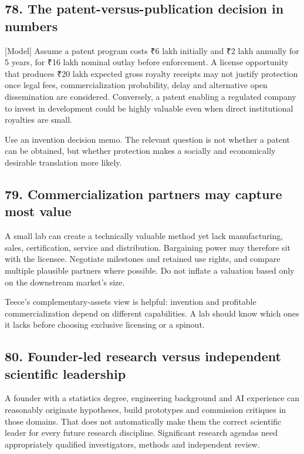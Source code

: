 \subsection{78. The patent-versus-publication decision in numbers}

[Model] Assume a patent program costs ₹6 lakh initially and ₹2 lakh annually for 5 years, for ₹16 lakh nominal outlay before enforcement. A license opportunity that produces ₹20 lakh expected gross royalty receipts may not justify protection once legal fees, commercialization probability, delay and alternative open dissemination are considered. Conversely, a patent enabling a regulated company to invest in development could be highly valuable even when direct institutional royalties are small.

Use an invention decision memo. The relevant question is not whether a patent can be obtained, but whether protection makes a socially and economically desirable translation more likely.

\subsection{79. Commercialization partners may capture most value}

A small lab can create a technically valuable method yet lack manufacturing, sales, certification, service and distribution. Bargaining power may therefore sit with the licensee. Negotiate milestones and retained use rights, and compare multiple plausible partners where possible. Do not inflate a valuation based only on the downstream market's size.

Teece's complementary-assets view is helpful: invention and profitable commercialization depend on different capabilities. A lab should know which ones it lacks before choosing exclusive licensing or a spinout.

\subsection{80. Founder-led research versus independent scientific leadership}

A founder with a statistics degree, engineering background and AI experience can reasonably originate hypotheses, build prototypes and commission critiques in those domains. That does not automatically make them the correct scientific leader for every future research discipline. Significant research agendas need appropriately qualified investigators, methods and independent review.

